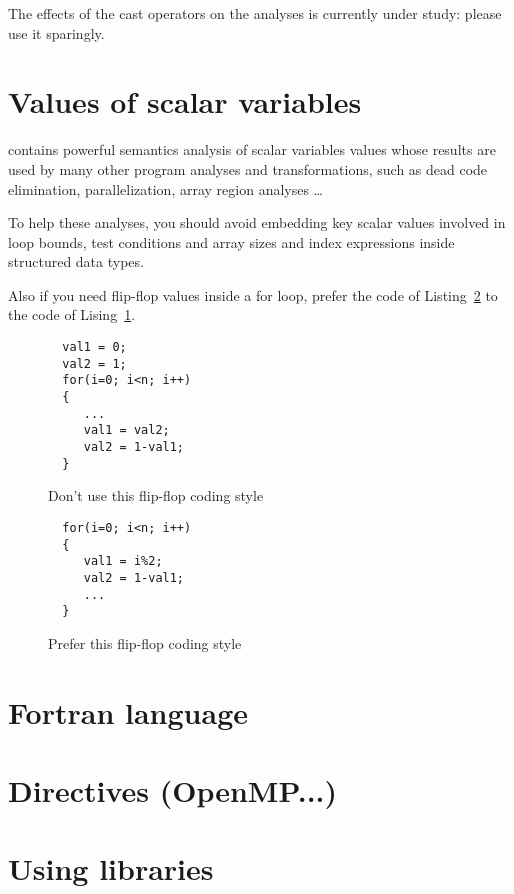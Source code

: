 \documentclass[a4paper]{article}
\begin{document}
The effects of the cast operators on the analyses is currently under
study: please use it sparingly.

\section{Values of scalar variables}
\label{sec:values_of_scalar_variables}

\Apips contains powerful semantics analysis of scalar variables values
whose results are used by many other program analyses and
transformations, such as dead code elimination, parallelization,
array region analyses \ldots

To help these analyses, you should avoid embedding key scalar values
involved in loop bounds, test conditions and array sizes and index
expressions inside structured data types.

Also if you need flip-flop values inside a for loop, prefer the code
of Listing~\ref{fig:good_flip_flop} to the code of
Lising~\ref{fig:bad_flip_flop}.

  \begin{figure}
    \begin{lstlisting}
  val1 = 0;
  val2 = 1;
  for(i=0; i<n; i++)
  {
     ...
     val1 = val2;
     val2 = 1-val1;
  }
    \end{lstlisting}
    \caption{Don't use this flip-flop coding style}
    \label{fig:bad_flip_flop}
  \end{figure}
  \begin{figure}
    \begin{lstlisting}
  for(i=0; i<n; i++)
  {
     val1 = i%2;
     val2 = 1-val1;
     ...
  }
    \end{lstlisting}
    \caption{Prefer this flip-flop coding style}
    \label{fig:good_flip_flop}
  \end{figure}

\section{Fortran language}
\label{sec:fortran-language}


\section{Directives (OpenMP...)}
\label{sec:directives}


\section{Using libraries}
\label{sec:using-libraries}
\end{document}
